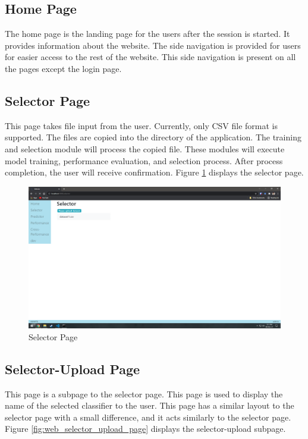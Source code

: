 \subsection{Home Page} \label{subsec:home_page}
The home page is the landing page for the users after the session is started. It provides information about the website. The side navigation is provided for users for easier access to the rest of the website. This side navigation is present on all the pages except the login page.

\subsection{Selector Page} \label{subsec:selector_page}
This page takes file input from the user. Currently, only CSV file format is supported. The files are copied into the directory of the application. The training and selection module will process the copied file. These modules will execute model training, performance evaluation, and selection process. After process completion, the user will receive confirmation. Figure \ref{fig:web_selector_page} displays the selector page.

\begin{figure}[H]
  \centering
  \includegraphics[width=0.7\columnwidth]{media/website/pages/02_selector.png}
  \caption{Selector Page}
  \label{fig:web_selector_page}
\end{figure}

\subsection{Selector-Upload Page} \label{subsec:selector_upload_page}
This page is a subpage to the selector page. This page is used to display the name of the selected classifier to the user. This page has a similar layout to the selector page with a small difference, and it acts similarly to the selector page. Figure \ref{fig:web_selector_upload_page} displays the selector-upload subpage.

